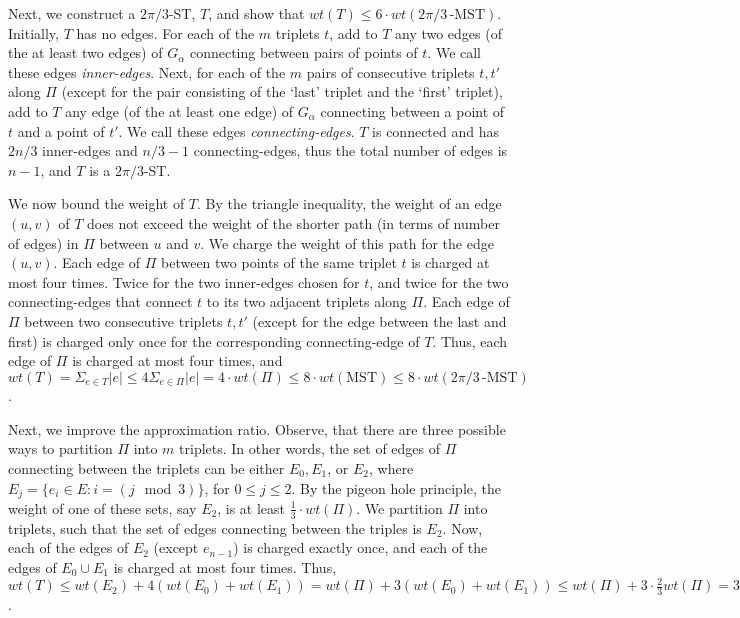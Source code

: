 \documentclass[11pt]{article}
\begin{document}
Next, we construct a $2\pi/3$-ST, $T$, and show that $wt(T) \le 6 \cdot wt(2\pi/3\!\,\mbox{-MST})$.
Initially, $T$ has no edges. For each of the $m$ triplets $t$, add to $T$ any two edges (of the at least two edges) of $G_{\alpha}$ connecting between pairs of points of $t$. We call these edges {\em inner-edges}. Next, for each of the $m$ pairs of consecutive triplets $t, t'$ along $\Pi$ (except for the pair consisting of the `last' triplet and the `first' triplet), add to $T$ any edge (of the at least one edge) of $G_{\alpha}$ connecting between a point of $t$ and a point of $t'$. We call these edges {\em connecting-edges}.
$T$ is connected and has $2n/3$ inner-edges and $n/3 - 1$ connecting-edges, thus the total number of edges is $n-1$, and $T$ is a $2\pi/3$-ST. 

We now bound the weight of $T$. By the triangle inequality, the weight of an edge $(u,v)$ of $T$ does not exceed the weight of the shorter path (in terms of number of edges) in $\Pi$ between $u$ and $v$. We charge the weight of this path for the edge $(u,v)$.
Each edge of $\Pi$ between two points of the same triplet $t$ is charged at most four times. Twice for the two inner-edges chosen for $t$, and twice for the two connecting-edges that connect $t$ to its two adjacent triplets along $\Pi$.
Each edge of $\Pi$ between two consecutive triplets $t, t'$ (except for the edge between the last and first) is charged only once for the corresponding connecting-edge of $T$. 
Thus, each edge of $\Pi$ is charged at most four times, and $wt(T) = \Sigma_{e \in T} |e| \le
4 \Sigma_{e \in \Pi}{|e|}=4 \cdot wt(\Pi) \le 8 \cdot wt(\mbox{MST}) \le 8 \cdot wt(2\pi/3\!\,\mbox{-MST})$.

Next, we improve the approximation ratio. Observe, that there are three possible ways to partition $\Pi$ into $m$ triplets.
In other words, the set of edges of $\Pi$ connecting between the triplets can be either $E_0, E_1$, or $E_2$, where
$E_j = \{ e_i \in E : i = (j \mod 3)\}$, for $0 \le j \le 2$. By the pigeon hole principle, the weight of one of these sets, say $E_2$, is at least $\frac{1}{3} \cdot wt(\Pi)$. We partition $\Pi$ into triplets, such that the set of edges connecting between the triples is $E_2$. Now, each of the edges of $E_2$ (except $e_{n-1}$) is charged exactly once, and each of the edges of $E_0 \cup E_1$ is charged at most four times. Thus, 
$wt(T) \leq wt(E_2) + 4(wt(E_0)+wt(E_1)) = wt(\Pi) + 3(wt(E_0)+wt(E_1)) \leq wt(\Pi) + 3 \cdot \frac{2}{3} wt(\Pi) = 3 \cdot wt(\Pi) \le 6 \cdot wt(\mbox{MST}) \le 6 \cdot wt(2\pi/3\!\,\mbox{-MST})$.
\end{document}
